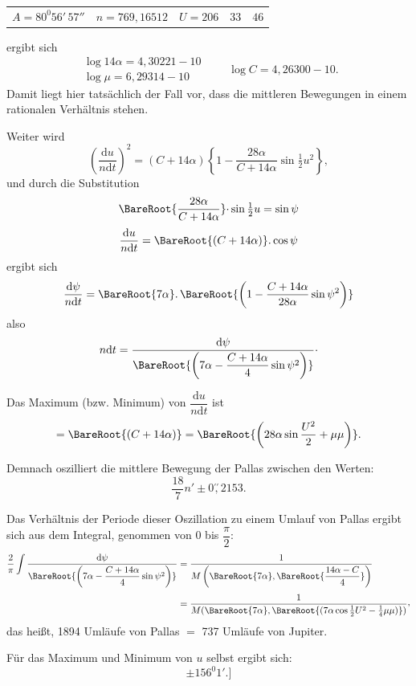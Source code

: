 \begin{landscape}
\begin{center}
\begin{tabular}{@{}lll@{}}
\(A=80^0 56'\,57''\)&\(n=769{,}16512\)&\(U=206\quad33\quad46\)
\end{tabular}
\end{center}
ergibt sich
\[
\begin{gathered}
\log14\alpha=4{,}30221-10\\
\log\mu=6{,}29314-10
\end{gathered}
\qquad\log C=4{,}26300-10.
\]
Damit liegt hier tatsächlich der Fall vor, dass die mittleren Bewegungen in einem rationalen Verhältnis stehen.
\par\noindent\hspace*{\parindent}Weiter wird
\[
\left(\frac{\mathrm{d}u}{n\mathrm{d}t}\right)^2=(C+14\alpha)\left\{1-\frac{28\alpha}{C+14\alpha}\sin\tfrac12u^2\right\},
\]
und durch die Substitution
\[
\BareRoot{\frac{28\alpha}{C+14\alpha}}\mathpunct{\cdot}\sin\tfrac12u=\sin\psi
\]
\[
\frac{\mathrm{d}u}{n\mathrm{d}t}=\BareRoot{(C+14\alpha)}\mathpunct{.}\cos\psi
\]
ergibt sich
\[
\frac{\mathrm{d}\psi}{n\mathrm{d}t}=\BareRoot{7\alpha}\mathpunct{.}\BareRoot{\left(1-\frac{C+14\alpha}{28\alpha}\sin\psi^2\right)}
\]
also
\[
n\mathrm{d}t=\frac{\mathrm{d}\psi}{\BareRoot{\left(7\alpha-\dfrac{C+14\alpha}{4}\sin\psi^2\right)}}\mathpunct{\cdot}
\]
\par\noindent\hspace*{\parindent}Das Maximum (bzw. Minimum) von \(\dfrac{\mathrm{d}u}{n\mathrm{d}t}\) ist
\[
=\BareRoot{(C+14\alpha)}=\BareRoot{\left(28\alpha\sin\frac{U^2}{2}+\mu\mu\right)}.
\]
\par\noindent\hspace*{\parindent}Demnach oszilliert die mittlere Bewegung der Pallas zwischen den Werten:
\[
\frac{18}{7}n'\pm0\overset{\prime\prime}{,}2153.
\]
\par\noindent\hspace*{\parindent}Das Verhältnis der Periode dieser Oszillation zu einem Umlauf von Pallas ergibt sich aus dem Integral, genommen von \(0\) bis \(\dfrac{\pi}{2}\):
\[
\begin{aligned}
\frac{2}{\pi}\int\frac{\mathrm{d}\psi}{\BareRoot{\left(7\alpha-\dfrac{C+14\alpha}{4}\sin\psi^2\right)}}
&=\frac{1}{M\left(\BareRoot{7\alpha},\BareRoot{\dfrac{14\alpha-C}{4}}\right)}\\[.8ex]
&=\frac{1}{M(\BareRoot{7\alpha},\BareRoot{(7\alpha\cos\tfrac12U^2-\tfrac14\mu\mu)})}\mathpunct{\raisebox{.35ex}{,}}
\end{aligned}
\]
das heißt, 1894 Umläufe von Pallas \(=\) 737 Umläufe von Jupiter.
\par\noindent\hspace*{\parindent}Für das Maximum und Minimum von \(u\) selbst ergibt sich:
\[
\pm156^0 1'.\text{]}
\]
\clearpage
\endgroup
\end{landscape}
